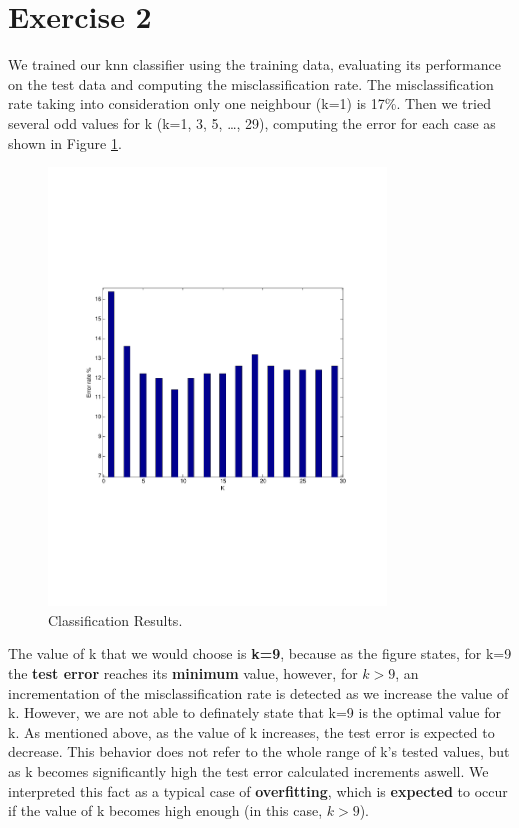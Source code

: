 \documentclass[letterpaper,11pt]{article}
\begin{document}
\section*{Exercise 2}
We trained our knn classifier using the training data, evaluating its performance on the test data and computing the misclassification rate. The misclassification rate taking into consideration only one neighbour (k=1) is 17\%. Then we tried several odd values for k (k=1, 3, 5, \ldots, 29), computing the error for each case as shown in Figure \ref{fig:3}.


  \begin{figure}[h!]
\centering
  \includegraphics[trim = 0cm 7cm 0cm 7.5cm, clip, width=0.8\textwidth]{figures/KnnResults.pdf}
  \caption{Classification Results.}
  \label{fig:3}
\end{figure}

The value of k that we would choose is \textbf{k=9}, because as the figure states, for k=9 the \textbf{test error} reaches its \textbf{minimum} value, however, for $k>9$, an incrementation of the misclassification rate is detected as we increase the value of k. However, we are not able to definately state that k=9 is the optimal value for k. As mentioned above, as the value of k increases, the test error is expected to decrease. This behavior does not refer to the whole range of k's tested values, but as k becomes significantly high the test error calculated increments aswell. We interpreted this fact as a typical case of \textbf{overfitting}, which is \textbf{expected} to occur if the value of k becomes high enough (in this case, $k>9$).
\end{document}
